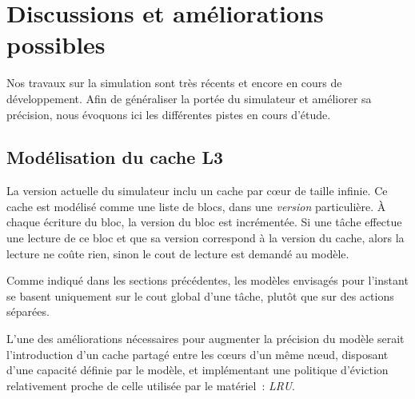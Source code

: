 





\section{Discussions et améliorations possibles}\label{sec:simulation:next}

Nos travaux sur la simulation sont très récents et encore en cours de développement.
Afin de généraliser la portée du simulateur et améliorer sa précision, nous évoquons ici les différentes pistes en cours d'étude.

\subsection{Modélisation du cache L3}

La version actuelle du simulateur inclu un cache par cœur de taille infinie.
Ce cache est modélisé comme une liste de blocs, dans une \emph{version} particulière.
À chaque écriture du bloc, la version du bloc est incrémentée.
Si une tâche effectue une lecture de ce bloc et que sa version correspond à la version du cache, alors la lecture ne coûte rien, sinon le cout de lecture est demandé au modèle.

Comme indiqué dans les sections précédentes, les modèles envisagés pour l'instant se basent uniquement sur le cout global d'une tâche, plutôt que sur des actions séparées.

L'une des améliorations nécessaires pour augmenter la précision du modèle serait l'introduction d'un cache partagé entre les cœurs d'un même nœud, disposant d'une capacité définie par le modèle, et implémentant une politique d'éviction relativement proche de celle utilisée par le matériel~: \emph{LRU}.

